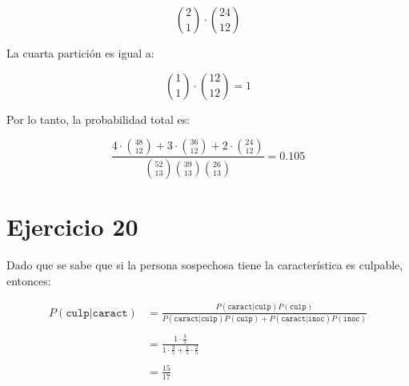 \documentclass[letterpaper,12pt]{memoir}
\theoremstyle{definition}
\begin{document}
\begin{equation}
  \binom{2}{1} \cdot \binom{24}{12}
\end{equation}

La cuarta partición es igual a:

\begin{equation}
  \binom{1}{1} \cdot \binom{12}{12} = 1
\end{equation}

Por lo tanto, la probabilidad total es:

\begin{equation}
  \frac{4 \cdot {48\choose 12} + 3\cdot{36\choose 12} + 2\cdot{24\choose 12}}{{52\choose 13}{39\choose 13}{26\choose 13}}  = 0.105
\end{equation}

\section*{Ejercicio 20}

Dado que se sabe que si la persona sospechosa tiene la característica es culpable, entonces:

\begin{align*}
  P(\texttt{culp|caract}) & = \frac{P(\texttt{caract|culp})P(\texttt{culp})}{P(\texttt{caract|culp})P(\texttt{culp})+P(\texttt{caract|inoc})P(\texttt{inoc})}\\
           & \\ 
           &  = \frac{1 \cdot \frac{3}{5}}{1 \cdot \frac{3}{5}+\frac{1}{5}\cdot\frac{2}{5}}\\
           & \\
           & = \frac{15}{17}\\
\end{align*}
\end{document}
